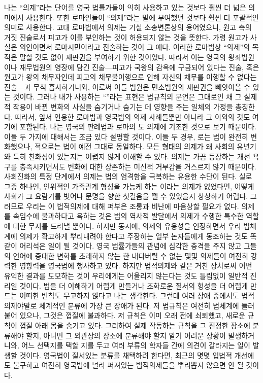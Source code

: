 나는 ``의제''라는 단어를 영국 법률가들이 익히 사용하고 있는 것보다
훨씬 더 넓은 의미에서 사용한다. 또한 로마인들이 ``의제''라는
말에 부여했던 것보다 훨씬 더 포괄적인 의미로 사용한다.
고대 로마법에서 의제는 기실 소송변론상의 용어였으니,
원고 측의 거짓 진술로서 피고가 이를 부인하는 것이 허용되지 않는 것을 뜻한다.
가령 원고가 사실은 외인이면서 로마시민이라고 진술하는 것이 그 예다.
이러한 로마법상 ``의제''의 목적은 말할 것도 없이 재판권을 부여하기 위한
것이었다.
\hypertarget{commonlawfiction}{따라서} 이는 영국의 왕좌법원이나
재무법원의 영장에 담긴
진술---피고가 국왕의 감옥에 구금되어 있다는 진술, 혹은
원고가 왕의 채무자인데 피고의 채무불이행으로 인해
자신의 채무를 이행할 수 없다는
진술---과 무척 흡사하거니와,
이로써 이들 법원은 민소법원의 재판권을 빼앗아올 수 있는
것이다.
그러나 내가 사용하는 ``''라는 표현은
법규칙의 문언은 그대로인 채 그 실제적 작용이 바뀐 변화의 사실을
숨기거나 숨기는 데 영향을 주는 일체의 가정을 총칭한다.
따라서, 앞서 인용한 로마법과 영국법의 의제 사례들뿐만 아니라
그 이외의 것도 여기에 포함된다. 나는 영국의 판례법과 로마의
도 의제에 기초한 것으로 보기 때문이다.
이들 두 가지에 대해서는 조금 있다 설명할 것이다.
이들 두 경우, 로는 법이 완전히 변화했으나,
적으로는 법이 예전 그대로 동일하다.
모든 형태의 의제가 왜 사회의 유년기와 특히 친화성이 있는지는 어렵지 않게
이해할 수 있다.
의제는 가끔 등장하는 개선 욕구를 충족시키면서도
변화에 대한 상존하는 미신적 거부감을 거스르지 않기 때문이다.
사회진화의 특정 단계에서 의제는 법의 엄격함을 극복하는 유용한 수단이 된다.
실로 그중 하나인, 인위적인 가족관계 형성을 가능케 하는
이라는 의제가 없었다면, 어떻게 사회가 그 요람기를 벗어나
문명을 향한 첫걸음을 뗄 수 있었을지 상상하기 어렵다.
그러므로 우리는 이 법적의제에 대해 퍼부은 조롱과 비난에 마음상할
필요가 없다.
의제를 속임수에 불과하다고 욕하는 것은 법의 역사적 발달에서
의제가 수행한 특수한 역할에 대한 무지를 드러낼 뿐이다.
하지만 동시에, 의제의 유용성을 인정하면서 우리 법체계에 의제가
확고하게 뿌리내려야 한다고 주장하는 일부 논자들에게 동조하는 것도 똑같이
어리석은 일이 될 것이다.
영국 법률가들의 관념에 심각한 충격을 주지 않고
그들의 언어에 중대한 변화를 초래하지 않는 한
내다버릴 수 없는 몇몇 의제들이 여전히 강력한 영향력을 영국법에 행사하고 있다.
하지만 법적의제와 같은 거친 장치로써 어떤 유익한 결과를 도모하는 것이
우리에게는 어울리지 않는다는 것도 틀림없이 일반적 진리일 것이다.
법을 더 이해하기 어렵게 만들거나 조화로운 질서의 형성을 더 어렵게 만드는
어떠한 변칙도 무고하지 않다고 나는 생각한다.
그런데 여러 장애 중에서도 법적의제야말로 체계적인 분류에 가장 큰
장애가 된다.
저 법규칙은 여전히 법체계에 들러붙어 있으나,
그것은 껍질에 불과하다.
저 규칙은 이미 오래 전에 쇠퇴했고, 새로운 규칙이 껍질 아래 몸을 숨기고 있다.
그리하여 실제 작동하는 규칙을 그 진정한 장소에 분류해야 할지,
아니면 그 외관상의 장소에 분류해야 할지 알기 어려운 상황이 발생하거니와,
어느 선택지를 택할 지를 두고 여러 부류의 학자들 간에 의견이
갈라지는 일이 발생할 것이다.
영국법이 질서있는 분류를 채택하려 한다면,
최근의 몇몇 입법적 개선에도 불구하고 여전히 영국법에 널리 퍼져있는
법적의제들을 뿌리뽑지 않으면 안 될 것이다.

